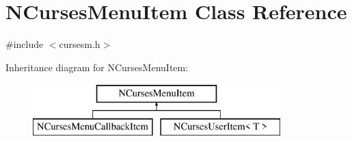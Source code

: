 \hypertarget{class_n_curses_menu_item}{\section{N\-Curses\-Menu\-Item Class Reference}
\label{class_n_curses_menu_item}
}


{\ttfamily \#include $<$cursesm.\-h$>$}

Inheritance diagram for N\-Curses\-Menu\-Item\-:\begin{figure}[H]
\begin{center}
\leavevmode
\includegraphics[height=2.000000cm]{class_n_curses_menu_item}
\end{center}
\end{figure}

